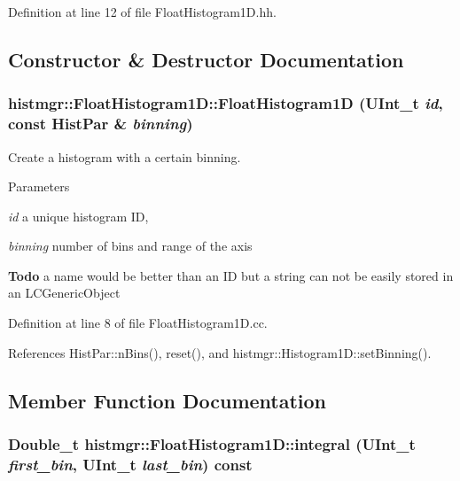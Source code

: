Definition at line 12 of file FloatHistogram1D.hh.

\subsection{Constructor \& Destructor Documentation}
\subsubsection[{FloatHistogram1D}]{\setlength{\rightskip}{0pt plus 5cm}histmgr::FloatHistogram1D::FloatHistogram1D (UInt\_\-t {\em id}, \/  const {\bf HistPar} \& {\em binning})}\label{classhistmgr_1_1FloatHistogram1D_a582ec9a1017297a5e56d159aeb18e2b9}


Create a histogram with a certain binning. 
\begin{DoxyParams}{Parameters}
\item[{\em id}]a unique histogram ID, \item[{\em binning}]number of bins and range of the axis \end{DoxyParams}
\begin{Desc}
\item[{\bf Todo}]a name would be better than an ID but a string can not be easily stored in an LCGenericObject \end{Desc}


Definition at line 8 of file FloatHistogram1D.cc.

References HistPar::nBins(), reset(), and histmgr::Histogram1D::setBinning().

\subsection{Member Function Documentation}
\subsubsection[{integral}]{\setlength{\rightskip}{0pt plus 5cm}Double\_\-t histmgr::FloatHistogram1D::integral (UInt\_\-t {\em first\_\-bin}, \/  UInt\_\-t {\em last\_\-bin}) const}\label{classhistmgr_1_1FloatHistogram1D_ae4ac2bba1858e9d7750306df22c12903}


